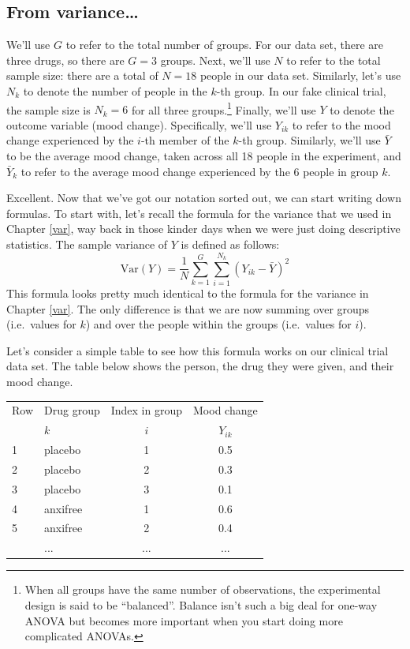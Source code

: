 \documentclass[
  11pt,
  a4paper,
  twoside,symmetric,openright]{book}
\theoremstyle{break}
\theoremstyle{break}
\begin{document}
\subsection{From variance\ldots{}}\label{from-variance}

We'll use \(G\) to refer to the total number of groups. For our data set, there are three drugs, so there are \(G=3\) groups. Next, we'll use \(N\) to refer to the total sample size: there are a total of \(N=18\) people in our data set. Similarly, let's use \(N_k\) to denote the number of people in the \(k\)-th group. In our fake clinical trial, the sample size is \(N_k = 6\) for all three groups.\footnote{When all groups have the same number of observations, the experimental design is said to be ``balanced''. Balance isn't such a big deal for one-way ANOVA but becomes more important when you start doing more complicated ANOVAs.} Finally, we'll use \(Y\) to denote the outcome variable (mood change). Specifically, we'll use \(Y_{ik}\) to refer to the mood change experienced by the \(i\)-th member of the \(k\)-th group. Similarly, we'll use \(\bar{Y}\) to be the average mood change, taken across all 18 people in the experiment, and \(\bar{Y}_k\) to refer to the average mood change experienced by the 6 people in group \(k\).

Excellent. Now that we've got our notation sorted out, we can start writing down formulas. To start with, let's recall the formula for the variance that we used in Chapter \ref{var}, way back in those kinder days when we were just doing descriptive statistics. The sample variance of \(Y\) is defined as follows:
\[
\mbox{Var}(Y) = \frac{1}{N} \sum_{k=1}^G \sum_{i=1}^{N_k} \left(Y_{ik} - \bar{Y} \right)^2
\]
This formula looks pretty much identical to the formula for the variance in Chapter \ref{var}. The only difference is that we are now summing over groups (i.e.~values for \(k\)) and over the people within the groups (i.e.~values for \(i\)).

Let's consider a simple table to see how this formula works on our clinical trial data set. The table below shows the person, the drug they were given, and their mood change.

\begin{table}[!h]
\centering
\begin{tabular}{llcc}
\toprule
\multicolumn{1}{c}{Row} & \multicolumn{1}{c}{Drug group} & \multicolumn{1}{c}{Index in group} & \multicolumn{1}{c}{Mood change} \\
\cmidrule(l{3pt}r{3pt}){1-1} \cmidrule(l{3pt}r{3pt}){2-2} \cmidrule(l{3pt}r{3pt}){3-3} \cmidrule(l{3pt}r{3pt}){4-4}
  & $k$ & $i$ & $Y_{ik}$\\
\midrule
1 & placebo & 1 & 0.5\\
2 & placebo & 2 & 0.3\\
3 & placebo & 3 & 0.1\\
4 & anxifree & 1 & 0.6\\
5 & anxifree & 2 & 0.4\\
\addlinespace
6 & ... & ... & ...\\
\bottomrule
\end{tabular}
\end{table}
\end{document}
